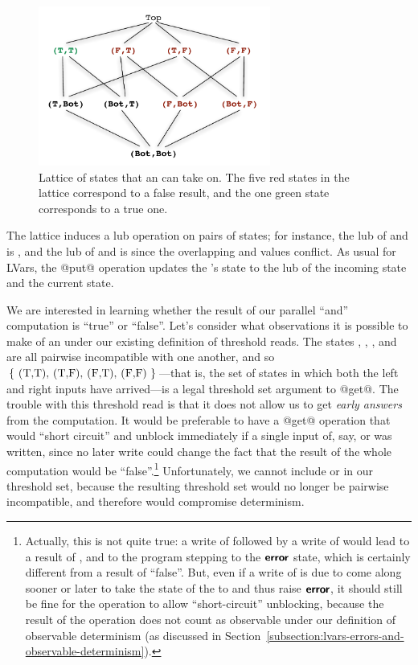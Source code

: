\begin{figure}
\begin{center}
  \includegraphics[width=3in]{chapter2/figures/lvars-parallel-and.pdf}
\end{center}
  \caption{Lattice of states that an  can take on.  The five
    red states in the lattice correspond to a false result, and the
    one green state corresponds to a true one.}
  \label{f:lvars-parallel-and}
\end{figure}

The lattice induces a lub operation on pairs of states; for instance,
the lub of  and  is , and the lub of
 and  is  since the overlapping 
and  values conflict.  As usual for LVars, the @put@ operation
updates the 's state to the lub of the incoming state and
the current state.

We are interested in learning whether the result of our parallel
``and'' computation is ``true'' or ``false''.  Let's consider what
observations it is possible to make of an  under our
existing definition of threshold reads.  The states ,
, , and  are all pairwise incompatible
with one another, and so $\setof{\textrm{ \il{(T,T)}, \il{(T,F)},
    \il{(F,T)}, \il{(F,F)} }}$---that is, the set of states in which
both the left and right inputs have arrived---is a legal threshold set
argument to @get@.  The trouble with this threshold read is that it
does not allow us to get \emph{early answers} from the computation.
It would be preferable to have a @get@ operation that would ``short
circuit'' and unblock immediately if a single input of, say,
 or  was written, since no later write could
change the fact that the result of the whole computation would be
``false''.\footnote{Actually, this is not quite true: a write of
   followed by a write of  would lead to a
  result of , and to the program stepping to the $\textbf{\textsf{error}}$
  state, which is certainly different from a result of ``false''.
  But, even if a write of  is due to come along sooner or
  later to take the state of the  to  and thus raise
  $\textbf{\textsf{error}}$, it should still be fine for the  operation to
  allow ``short-circuit'' unblocking, because the result of the
   operation does not count as observable under our definition
  of observable determinism (as discussed in
  Section~\ref{subsection:lvars-errors-and-observable-determinism}).}
Unfortunately, we cannot include  or  in our
threshold set, because the resulting threshold set would no longer be
pairwise incompatible, and therefore would compromise determinism.

